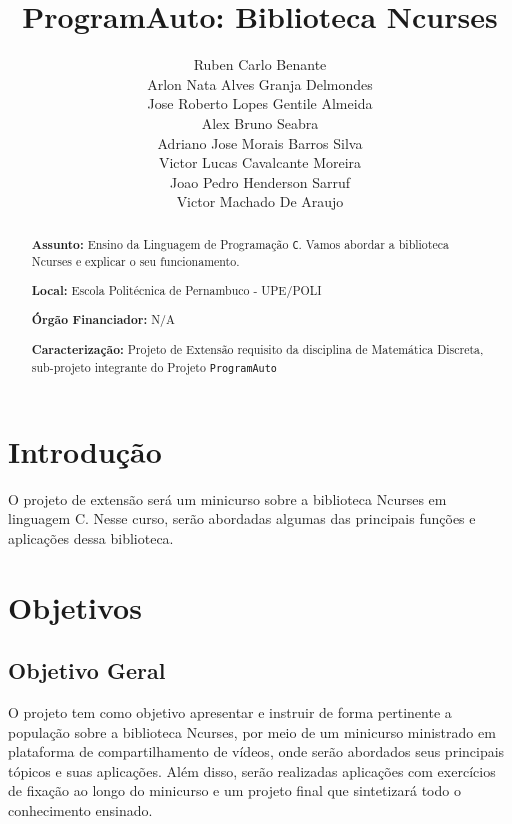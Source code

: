 \documentclass[a4paper,10pt]{article} %
\title{ProgramAuto: Biblioteca Ncurses}
\author{Ruben Carlo Benante \\ Arlon Nata Alves Granja Delmondes \\ Jose Roberto Lopes Gentile Almeida \\ Alex Bruno Seabra \\ Adriano Jose Morais Barros Silva \\ Victor Lucas Cavalcante Moreira \\ Joao Pedro Henderson Sarruf \\ Victor Machado De Araujo}
\begin{document}
\maketitle

\begin{abstract}
\textbf{Assunto:} Ensino da Linguagem de Programação \texttt{C}.
Vamos abordar a biblioteca Ncurses e explicar o seu funcionamento.



\textbf{Local:} Escola Politécnica de Pernambuco - UPE/POLI

\textbf{Órgão Financiador:} N/A

\textbf{Caracterização:} Projeto de Extensão requisito da disciplina de Matemática Discreta, sub-projeto integrante do Projeto \texttt{ProgramAuto}


\end{abstract}


\section{Introdução}

O projeto de extensão será um minicurso sobre a biblioteca Ncurses em linguagem C. Nesse curso, serão abordadas algumas das principais funções e aplicações dessa biblioteca.

\section{Objetivos}

\subsection{Objetivo Geral}
O projeto tem como objetivo apresentar e instruir de forma pertinente a população sobre a biblioteca Ncurses, por meio de um minicurso ministrado em plataforma de compartilhamento de vídeos, onde serão abordados seus principais tópicos e suas aplicações. Além disso, serão realizadas aplicações com exercícios de fixação ao longo do minicurso e um projeto final que sintetizará todo o conhecimento ensinado.
\end{document}
